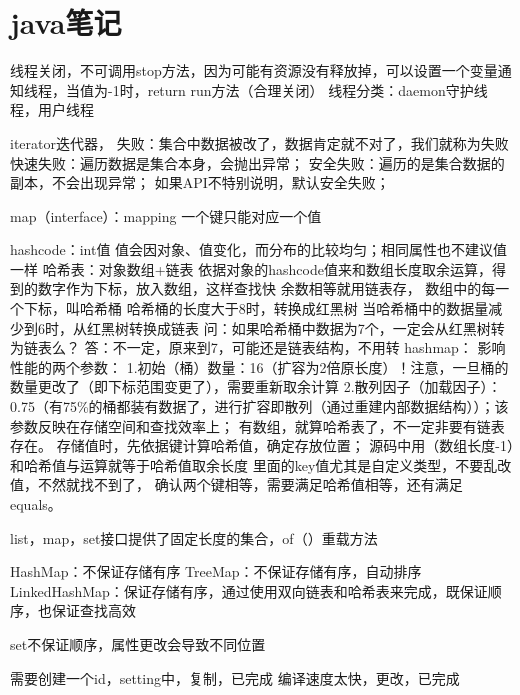 \documentclass[utf8]{ctexart}
\begin{document}
    \section{java笔记}
    线程关闭，不可调用stop方法，因为可能有资源没有释放掉，可以设置一个变量通知线程，当值为-1时，return run方法（合理关闭）
    线程分类：daemon守护线程，用户线程

    iterator迭代器，
    失败：集合中数据被改了，数据肯定就不对了，我们就称为失败
        快速失败：遍历数据是集合本身，会抛出异常；
        安全失败：遍历的是集合数据的副本，不会出现异常；
        如果API不特别说明，默认安全失败；

    map（interface）：mapping
        一个键只能对应一个值

    hashcode：int值
            值会因对象、值变化，而分布的比较均匀；相同属性也不建议值一样
    哈希表：对象数组+链表
        依据对象的hashcode值来和数组长度取余运算，得到的数字作为下标，放入数组，这样查找快
        余数相等就用链表存，
        数组中的每一个下标，叫哈希桶
        哈希桶的长度大于8时，转换成红黑树
        当哈希桶中的数据量减少到6时，从红黑树转换成链表
            问：如果哈希桶中数据为7个，一定会从红黑树转为链表么？
                答：不一定，原来到7，可能还是链表结构，不用转
    hashmap： 
        影响性能的两个参数：
            1.初始（桶）数量：16（扩容为2倍原长度）！注意，一旦桶的数量更改了（即下标范围变更了），需要重新取余计算
            2.散列因子（加载因子）：0.75（有75\%的桶都装有数据了，进行扩容即散列（通过重建内部数据结构））；该参数反映在存储空间和查找效率上；
        有数组，就算哈希表了，不一定非要有链表存在。
        存储值时，先依据键计算哈希值，确定存放位置；
        源码中用（数组长度-1）和哈希值与运算就等于哈希值取余长度
        里面的key值尤其是自定义类型，不要乱改值，不然就找不到了，
        确认两个键相等，需要满足哈希值相等，还有满足equals。
    

    list，map，set接口提供了固定长度的集合，of（）重载方法

    HashMap：不保证存储有序
    TreeMap：不保证存储有序，自动排序
    LinkedHashMap：保证存储有序，通过使用双向链表和哈希表来完成，既保证顺序，也保证查找高效


    set不保证顺序，属性更改会导致不同位置


    需要创建一个id，setting中，复制，已完成
    编译速度太快，更改，已完成
\end{document}
